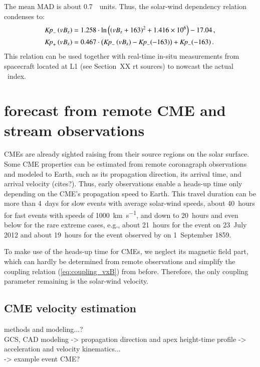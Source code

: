 The mean MAD is about 0.7~\Kp{}~units. Thus, the solar-wind dependency relation condenses to:
\begin{align}
	\text{\textit{Kp}}_-\left(vB_\text{z}\right) &= 1.258 \cdot \ln\left(\left(vB_\text{z} + 163\right)^2 + \num{1.416e6}\right) - 17.04	\,,	\label{eq:kpvsvbz_dependency_function_negative}\\
	\text{\textit{Kp}}_+\left(vB_\text{z}\right) &= 0.467 \cdot \left(\text{\textit{Kp}}_-\left(vB_\text{z}\right) - \text{\textit{Kp}}_-(-163)\right) + \text{\textit{Kp}}_-(-163)	\,.	\label{eq:kpvsvbz_dependency_function_positive}
\end{align}
This relation can be used together with real-time in-situ measurements from spacecraft located at L1 (see Section~XX rt sources) to nowcast the actual \Kp~index.


\section{\Kp{} forecast from remote CME and stream observations}
\label{sec:kp_forecast}
CMEs are already sighted raising from their source regions on the solar surface. Some CME properties can be estimated from remote coronagraph observations and modeled to Earth, such as its propagation direction, its arrival time, and arrival velocity (cites?). Thus, early observations enable a heads-up time only depending on the CME's propagation speed to Earth. This travel duration can be more than 4~days for slow events with average solar-wind speeds, about 40~hours for fast events with speeds of \SI{1000}{\km\per\s}, and down to 20~hours and even below for the rare extreme cases, e.g., about 21~hours for the event on 23~July 2012 \citep{Russell2013,Temmer2015} and about 19~hours for the event observed by \citet{Carrington1859} on 1~September 1859.

To make use of the heads-up time for CMEs, we neglect its magnetic field part, which can hardly be determined from remote observations and simplify the coupling relation (\ref{eq:coupling_vxB}) from before. Therefore, the only coupling parameter remaining is the solar-wind velocity.

\subsection{CME velocity estimation}
methods and modeling...?\\
GCS, CAD modeling -> propagation direction and apex height-time profile -> acceleration and velocity kinematics...\\
-> example event CME?\\

